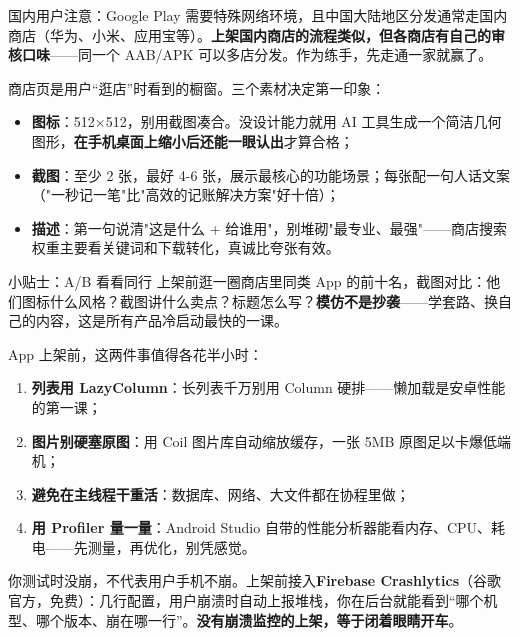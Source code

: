 国内用户注意：Google Play 需要特殊网络环境，且中国大陆地区分发通常走国内商店（华为、小米、应用宝等）。\textbf{上架国内商店的流程类似，但各商店有自己的审核口味}——同一个 AAB/APK 可以多店分发。作为练手，先走通一家就赢了。


商店页是用户“逛店”时看到的橱窗。三个素材决定第一印象：

\begin{itemize}
  \item \textbf{图标}：512×512，别用截图凑合。没设计能力就用 AI 工具生成一个简洁几何图形，\textbf{在手机桌面上缩小后还能一眼认出}才算合格；
  \item \textbf{截图}：至少 2 张，最好 4-6 张，展示最核心的功能场景；每张配一句人话文案（"一秒记一笔"比"高效的记账解决方案"好十倍）；
  \item \textbf{描述}：第一句说清"这是什么 + 给谁用"，别堆砌"最专业、最强"——商店搜索权重主要看关键词和下载转化，真诚比夸张有效。
\end{itemize}

\begin{tcbinfo}{小贴士：A/B 看看同行}
上架前逛一圈商店里同类 App 的前十名，截图对比：他们图标什么风格？截图讲什么卖点？标题怎么写？\textbf{模仿不是抄袭}——学套路、换自己的内容，这是所有产品冷启动最快的一课。

\end{tcbinfo}


App 上架前，这两件事值得各花半小时：


\begin{enumerate}
  \item \textbf{列表用 LazyColumn}：长列表千万别用 Column 硬排——懒加载是安卓性能的第一课；
  \item \textbf{图片别硬塞原图}：用 Coil 图片库自动缩放缓存，一张 5MB 原图足以卡爆低端机；
  \item \textbf{避免在主线程干重活}：数据库、网络、大文件都在协程里做；
  \item \textbf{用 Profiler 量一量}：Android Studio 自带的性能分析器能看内存、CPU、耗电——先测量，再优化，别凭感觉。
\end{enumerate}


你测试时没崩，不代表用户手机不崩。上架前接入\textbf{Firebase Crashlytics}（谷歌官方，免费）：几行配置，用户崩溃时自动上报堆栈，你在后台就能看到“哪个机型、哪个版本、崩在哪一行”。\textbf{没有崩溃监控的上架，等于闭着眼睛开车}。

